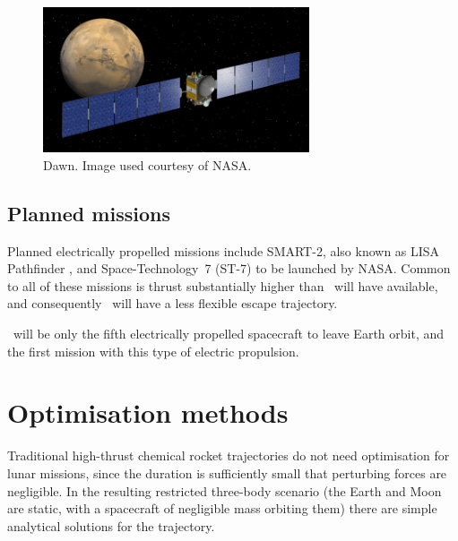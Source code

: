 \begin{figure}[ht]
\caption{Dawn. Image used courtesy of NASA.}
\label{fig:Dawn}
\centering
\includegraphics  [width=0.7\textwidth] {Images/mars-browse.jpg}
\end{figure}

\subsection{Planned missions}
Planned electrically propelled missions include SMART-2, also known as LISA Pathfinder \parencite{web_SMART-2}, and Space-Technology~7 (ST-7) to be launched by NASA. Common to all of these missions is thrust substantially higher than \BW\ will have available, and consequently \BW\ will have a less flexible escape trajectory.

\BW\ will be only the fifth electrically propelled spacecraft to leave Earth orbit, and the first mission with this type of electric propulsion.




\section{Optimisation methods} \label{sec:Optimisation-methods}




Traditional high-thrust chemical rocket trajectories do not need optimisation for lunar missions, since the duration is sufficiently small that perturbing forces are negligible. In the resulting restricted three-body scenario (the Earth and Moon are static, with a spacecraft of negligible mass orbiting them) there are simple analytical solutions for the trajectory.

